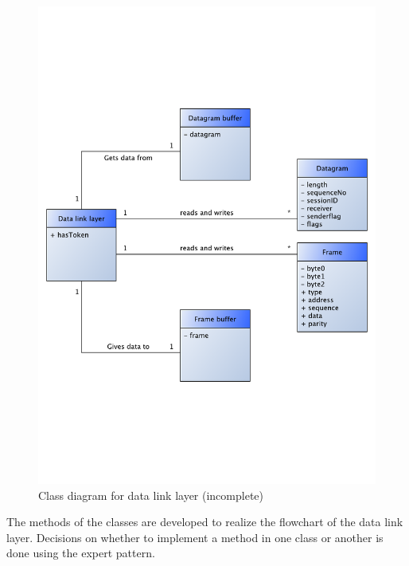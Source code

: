 \documentclass[letterpaper]{article}
\begin{document}
\begin{figure}[htb]
	\begin{center}
	\includegraphics[scale=0.5,trim=0 0 0
	0]{content/graphics/dll_class_diagram.pdf}
	\caption{Class diagram for data link layer (incomplete)}
	\label{Class diagram for data link layer (incomplete)}	
	\end{center}
\end{figure}

The methods of the classes are developed to realize the flowchart of the data
link layer. Decisions on whether to implement a method in one class or another
is done using the expert pattern.
\end{document}
